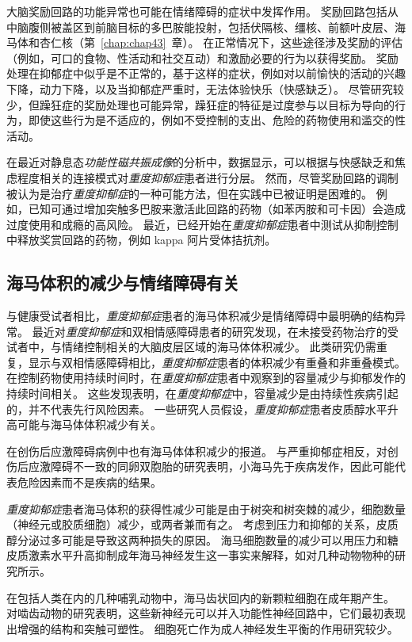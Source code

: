 大脑奖励回路的功能异常也可能在情绪障碍的症状中发挥作用。
奖励回路包括从中脑腹侧被盖区到前脑目标的多巴胺能投射，包括伏隔核、缰核、前额叶皮层、海马体和杏仁核（第~\ref{chap:chap43}~章）。
在正常情况下，这些途径涉及奖励的评估（例如，可口的食物、性活动和社交互动）和激励必要的行为以获得奖励。
奖励处理在抑郁症中似乎是不正常的，基于这样的症状，例如对以前愉快的活动的兴趣下降，动力下降，以及当抑郁症严重时，无法体验快乐（快感缺乏）。
尽管研究较少，但躁狂症的奖励处理也可能异常，躁狂症的特征是过度参与以目标为导向的行为，即使这些行为是不适应的，例如不受控制的支出、危险的药物使用和滥交的性活动。


在最近对静息态\textit{功能性磁共振成像}的分析中，数据显示，可以根据与快感缺乏和焦虑程度相关的连接模式对\textit{重度抑郁症}患者进行分层。
然而，尽管奖励回路的调制被认为是治疗\textit{重度抑郁症}的一种可能方法，但在实践中已被证明是困难的。
例如，已知可通过增加突触多巴胺来激活此回路的药物（如苯丙胺和可卡因）会造成过度使用和成瘾的高风险。
最近，已经开始在\textit{重度抑郁症}患者中测试从抑制控制中释放奖赏回路的药物，例如 kappa 阿片受体拮抗剂。



\subsection{海马体积的减少与情绪障碍有关}

与健康受试者相比，\textit{重度抑郁症}患者的海马体积减少是情绪障碍中最明确的结构异常。
最近对\textit{重度抑郁症}和双相情感障碍患者的研究发现，在未接受药物治疗的受试者中，与情绪控制相关的大脑皮层区域的海马体体积减少。
此类研究仍需重复，显示与双相情感障碍相比，\textit{重度抑郁症}患者的体积减少有重叠和非重叠模式。
在控制药物使用持续时间时，在\textit{重度抑郁症}患者中观察到的容量减少与抑郁发作的持续时间相关。
这些发现表明，在\textit{重度抑郁症}中，容量减少是由持续性疾病引起的，并不代表先行风险因素。
一些研究人员假设，\textit{重度抑郁症}患者皮质醇水平升高可能与海马体体积减少有关。


在创伤后应激障碍病例中也有海马体体积减少的报道。
与严重抑郁症相反，对创伤后应激障碍不一致的同卵双胞胎的研究表明，小海马先于疾病发作，因此可能代表危险因素而不是疾病的结果。


\textit{重度抑郁症}患者海马体积的获得性减少可能是由于树突和树突棘的减少，细胞数量（神经元或胶质细胞）减少，或两者兼而有之。
考虑到压力和抑郁的关系，皮质醇分泌过多可能是导致这两种损失的原因。
海马细胞数量的减少可以用压力和糖皮质激素水平升高抑制成年海马神经发生这一事实来解释，如对几种动物物种的研究所示。


在包括人类在内的几种哺乳动物中，海马齿状回内的新颗粒细胞在成年期产生。
对啮齿动物的研究表明，这些新神经元可以并入功能性神经回路中，它们最初表现出增强的结构和突触可塑性。
细胞死亡作为成人神经发生平衡的作用研究较少。


